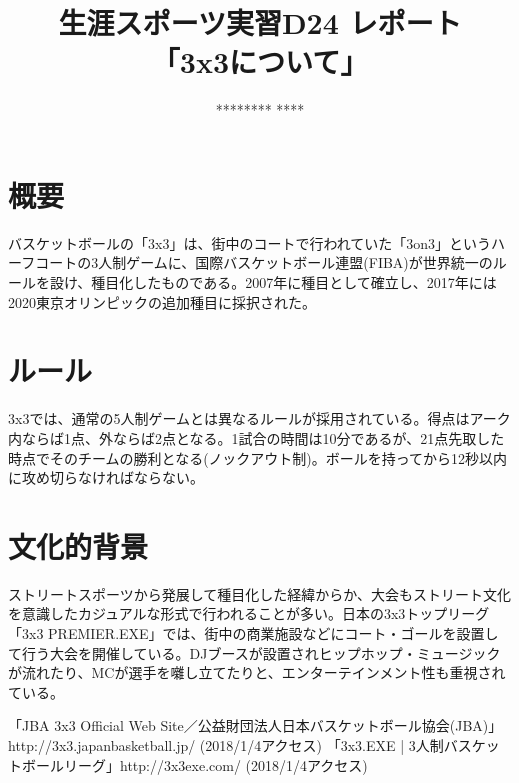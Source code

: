 \documentclass{jsarticle}
\title{生涯スポーツ実習D24 レポート\\「3x3について」}
\author{******** ****}
\begin{document}
\date{}
\maketitle

\section{概要}

バスケットボールの「3x3」は、街中のコートで行われていた「3on3」というハーフコートの3人制ゲームに、国際バスケットボール連盟(FIBA)が世界統一のルールを設け、種目化したものである。2007年に種目として確立し、2017年には2020東京オリンピックの追加種目に採択された。

\section{ルール}

3x3では、通常の5人制ゲームとは異なるルールが採用されている。得点はアーク内ならば1点、外ならば2点となる。1試合の時間は10分であるが、21点先取した時点でそのチームの勝利となる(ノックアウト制)。ボールを持ってから12秒以内に攻め切らなければならない。

\section{文化的背景}

ストリートスポーツから発展して種目化した経緯からか、大会もストリート文化を意識したカジュアルな形式で行われることが多い。日本の3x3トップリーグ「3x3 PREMIER.EXE」では、街中の商業施設などにコート・ゴールを設置して行う大会を開催している。DJブースが設置されヒップホップ・ミュージックが流れたり、MCが選手を囃し立てたりと、エンターテインメント性も重視されている。

\begin{thebibliography}{1}
   「JBA 3x3 Official Web Site／公益財団法人日本バスケットボール協会(JBA)」http://3x3.japanbasketball.jp/ (2018/1/4アクセス)
   「3x3.EXE | 3人制バスケットボールリーグ」http://3x3exe.com/ (2018/1/4アクセス)
\end{thebibliography}
\end{document}
